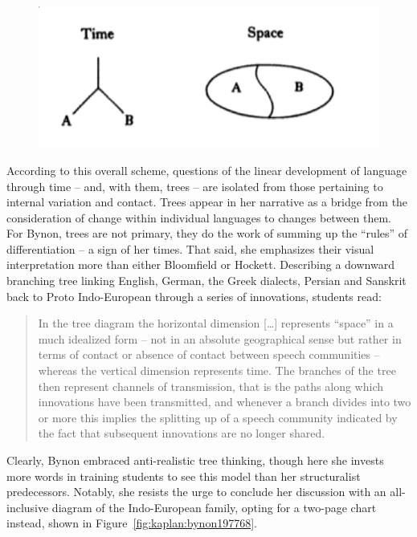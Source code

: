 \documentclass[output=paper]{langscibook}
\begin{document}
\begin{figure}
    \centering
    \includegraphics[scale=1]{figures/bynon1977.png}
    \caption{\citet[173]{Bynon1977}}
    \label{fig:kaplan:bynon1977}
\end{figure}

According to this overall scheme, questions of the linear development of language through time -- and, with them, trees -- are isolated from those pertaining to internal variation and contact. Trees appear in her narrative as a bridge from the consideration of change within individual languages to changes between them. For Bynon, trees are not primary, they do the work of summing up the ``rules'' of differentiation -- a sign of her times. That said, she emphasizes their visual interpretation more than either Bloomfield or Hockett. Describing a downward branching tree linking English, German, the Greek dialects, Persian and Sanskrit back to Proto Indo-European through a series of innovations, students read:

\begin{quotation}
In the tree diagram the horizontal dimension […] represents ``space'' in a much idealized form -- not in an absolute geographical sense but rather in terms of contact or absence of contact between speech communities -- whereas the vertical dimension represents time. The branches of the tree then represent channels of transmission, that is the paths along which innovations have been transmitted, and whenever a branch divides into two or more this implies the splitting up of a speech community indicated by the fact that subsequent innovations are no longer shared. \citep[66]{Bynon1977}
\end{quotation}

Clearly, Bynon embraced anti-realistic tree thinking, though here she invests more words in training students to see this model than her structuralist predecessors. Notably, she resists the urge to conclude her discussion with an all-inclusive diagram of the Indo-European family, opting for a two-page chart instead, shown in Figure~\ref{fig:kaplan:bynon197768}.
\end{document}
